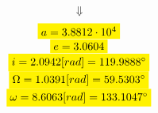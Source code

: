 \documentclass[11pt, a4paper]{article}
\begin{document}
$$\Downarrow$$
\begin{equation}
\begin{matrix}
    \colorbox{yellow}{$a = 3.8812\cdot10^4$}\\
    \colorbox{yellow}{$e = 3.0604$}\\
    \colorbox{yellow}{$i = 2.0942[rad] = 119.9888^\circ$}\\
    \colorbox{yellow}{$\Omega = 1.0391 [rad] = 59.5303^\circ$}\\
    \colorbox{yellow}{$\omega = 8.6063 [rad] = 133.1047^\circ$}
\end{matrix}
\end{equation}

\newpage


\end{document}

